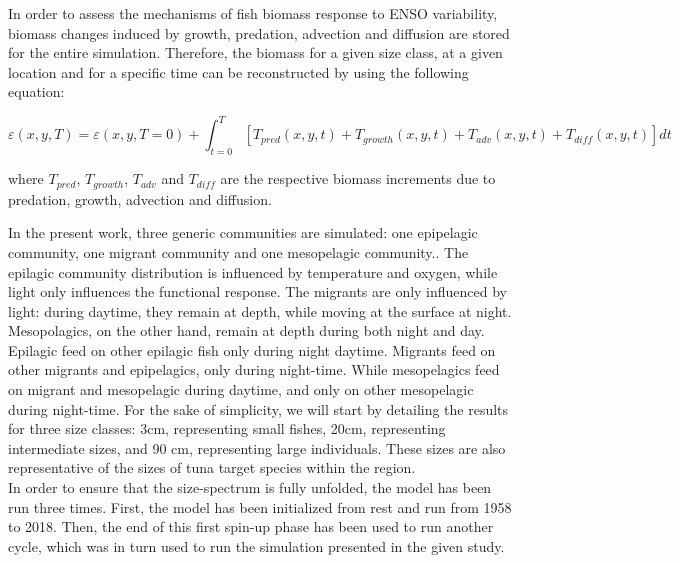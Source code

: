 In order to assess the mechanisms of fish biomass response to ENSO variability, biomass changes induced by growth, predation, advection and diffusion are stored for the entire simulation. Therefore, the biomass for a given size class, at a given location and for a specific time can be reconstructed by using the following equation:

\begin{equation}
\varepsilon(x,y,T) = \varepsilon(x,y,T=0) + \int_{t=0}^{T} \left[ 
T_{pred}(x, y,t) + 
T_{growth}(x, y,t) + 
T_{adv}(x, y,t) + 
T_{diff}(x, y,t) 
\right] dt 
\label{eq:rec_oope}
\end{equation}

where $T_{pred}$, $T_{growth}$, $T_{adv}$ and $T_{diff}$ are the respective biomass increments due to predation, growth, advection and diffusion.

In the present work, three generic communities are simulated: one epipelagic community, one migrant community and one mesopelagic community.. The epilagic community distribution is influenced by temperature and oxygen, while light only influences the functional response. The migrants are only influenced by light: during daytime, they remain at depth, while moving at the surface at night. Mesopolagics, on the other hand, remain at depth during both night and day. Epilagic feed on other epilagic fish only during night daytime. Migrants feed on other migrants and epipelagics, only during night-time. While mesopelagics feed on migrant and mesopelagic during daytime, and only on other mesopelagic during night-time.
For the sake of simplicity, we will start by detailing the results for three size classes: 3cm, representing small fishes, 20cm, representing intermediate sizes, and 90 cm, representing large individuals. These sizes are also representative of the sizes of tuna target species within the region.\\

In order to ensure that the size-spectrum is fully unfolded, the model has been run three times. First, the model has been initialized from rest and run from 1958 to 2018. Then, the end of this first spin-up phase has been used to run another cycle, which was in turn used to run the simulation presented in the given study.


